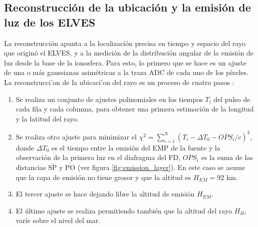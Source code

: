 \documentclass[11pt,oneside,openany,letter]{book}
\begin{document}
\subsection{Reconstrucci\'on de la ubicaci\'on y la emisi\'on de luz de los ELVES }
La reconstrucción apunta a la localización precisa en tiempo y espacio del rayo que origin\'o el ELVES, y a la medición de la distribución angular de la emisión de luz desde la base de la ionosfera. Para esto, lo primero que se hace es un ajuste de una o m\'as gaussianas asim\'etricas a la traza ADC de cada uno de los píxeles. La reconstrucci'on de la ubicaci'on del rayo es un proceso de cuatro pasos \cite{Mussa2019}:
\begin{enumerate}
    \item Se realiza un conjunto de ajustes polinomiales en los tiempos $T_i$ del pulso de cada fila y cada columna, para obtener una primera estimaci\'on de la longitud y la latitud del rayo. 
    
    \item Se realiza otro ajuste para minimizar el $\chi ^{2}= \sum_{i=1}^{N} \left( T_i -\Delta T_0 -\overline{OPS}_i/c \right)^{2}$, donde $\Delta T_0$ es el tiempo entre la emisión del EMP de la fuente y la observación de la primera luz en el diafragma del FD, $\overline{OPS}_i$ es la suma de las distancias $\overline{\text{SP}}$ y $\overline{\text{PO}}$ (ver figura \ref{fig:emission_layer}). En este caso se asume que la capa de emisión no tiene grosor y que la altitud es $H_{EM}=92$ km.
    
    \item El tercer ajuste se hace dejando libre la altitud de emisión $H_{EM}$.
    
    \item El último ajuste se realiza permitiendo también que la altitud del rayo $H_B$, varíe sobre el nivel del mar.
\end{enumerate}
\end{document}
